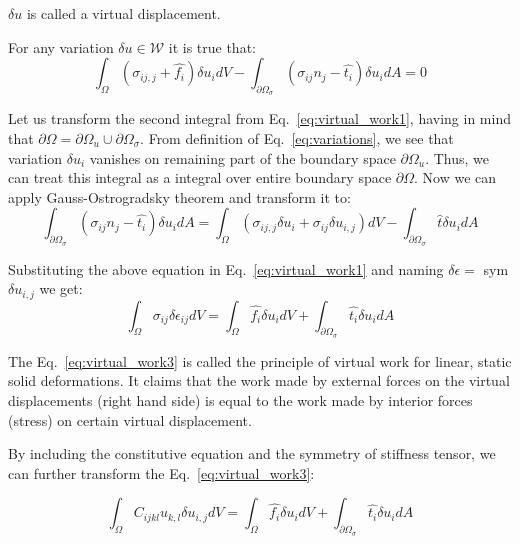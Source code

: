 \documentclass[en]{minipw} %
\begin{document}
$\delta u$ is called a virtual displacement. 

For any variation $\delta u \in \mathcal{W}$ it is true that:
\begin{equation}
\label{eq:virtual_work1}
\int_{\Omega}(\sigma_{ij,j} + \hat{f_i}) \delta u_{i} dV - \int_{\partial \Omega_{\sigma}}(\sigma_{ij}n_{j} - \hat{t_{i}}) \delta u_{i}dA = 0
\end{equation}

Let us transform the second integral from Eq.~\ref{eq:virtual_work1}, having in mind that $\partial \Omega = \partial \Omega_{u} \cup \partial \Omega_{\sigma}$. From definition of Eq.~\ref{eq:variations}, we see that variation $\delta u_{i}$ vanishes on remaining part of the boundary space $\partial \Omega_{u}$. Thus, we can treat this integral as a integral over entire boundary space $\partial \Omega$. Now we can apply Gauss-Ostrogradsky theorem and transform it to:
\begin{equation}
\label{eq:virtual_work2}
\int_{\partial \Omega_{\sigma}}(\sigma_{ij}n_{j} - \hat{t_{i}}) \delta u_{i}dA = \int_{\Omega}(\sigma_{ij,j} \delta u_{i} + \sigma_{ij} \delta u_{i,j}) dV - \int_{\partial \Omega_{\sigma}} \hat{t} \delta u_i dA
\end{equation}

Substituting the above equation in Eq.~\ref{eq:virtual_work1} and naming $\delta \epsilon =$ sym $\delta u_{i,j}$ we get:
\begin{equation}
\label{eq:virtual_work3}
\int_{\Omega}\sigma_{ij} \delta \epsilon_{ij} dV = \int_{\Omega} \hat{f_i} \delta u_{i} dV + \int_{\partial \Omega_{\sigma}} \hat{t_i} \delta u_{i} dA
\end{equation}

The Eq.~\ref{eq:virtual_work3} is called the principle of virtual work for linear, static solid deformations. It claims that the work made by external forces on the virtual displacements (right hand side) is equal to the work made by interior forces (stress) on certain virtual displacement.

By including the constitutive equation and the symmetry of stiffness tensor, we can further transform the Eq.~\ref{eq:virtual_work3}:

\begin{equation}
\label{eq:virtual_work4}
\int_{\Omega}C_{ijkl} u_{k,l} \delta u_{i,j} dV = \int_{\Omega} \hat{f_i} \delta u_{i} dV + \int_{\partial \Omega_{\sigma}} \hat{t_i} \delta u_{i} dA
\end{equation}
\end{document}

